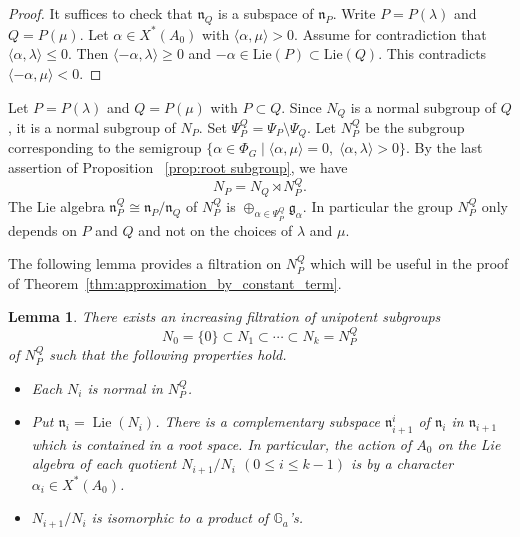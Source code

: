 \documentclass[letterpaper,11pt]{amsart}
\newcommand{\fg}{\mathfrak{g}}
\newcommand{\fn}{\mathfrak{n}}
\newcommand{\bG}{\mathbb{G}}
\newcommand{\<}{\negthickspace}
\DeclareMathOperator{\Lie}{Lie}
\theoremstyle{definition}
\theoremstyle{plain}
\newtheorem{lemma}[definition]{Lemma}
\theoremstyle{remark}
\numberwithin{equation}{section}
\begin{document}
\begin{proof}
It suffices to check that $\fn_Q$ is a subspace of $\fn_P$. Write
$P=P(\lambda)$ and $Q=P(\mu)$. Let $\alpha \in X^*(A_0)$ with $\langle \alpha, \mu \rangle > 0$. Assume for contradiction that $\langle
\alpha, \lambda \rangle \le 0$. Then $\langle -\alpha, \lambda \rangle \ge
0$ and $-\alpha \in \mathrm{Lie}(P) \subset \mathrm{Lie}(Q)$. This
contradicts $\langle -\alpha, \mu  \rangle < 0$.
\end{proof}

Let $P=P(\lambda)$ and $Q=P(\mu)$ with $P \subset Q$. Since $N_Q$ is a normal
subgroup of $Q$, it is a normal subgroup of $N_P$. Set $\Psi_P^Q=\Psi_P \setminus \Psi_Q$. Let $N_P^Q$ be the
subgroup corresponding to the semigroup $\{ \alpha \in \Phi_G \mid \langle \alpha, \mu
\rangle = 0, \; \langle \alpha , \lambda \rangle > 0 \}$. By the last assertion of Proposition
~\ref{prop:root subgroup}, we have
    \[
    N_P = N_Q \rtimes N_P^Q.
    \]
The Lie algebra $\fn_P^Q \cong \fn_P/\fn_Q$ of $N_P^Q$ is $\oplus_{\alpha \in \Psi_P^Q} \fg_\alpha$. In particular the group $N_P^Q$ only depends on $P$
and $Q$ and not on the choices of $\lambda$ and $\mu$.

The following lemma provides a filtration on $N_P^Q$ which will be useful in the
proof of Theorem~\ref{thm:approximation_by_constant_term}.

\begin{lemma} \label{lem:filtration_of_NPQ}
    There exists an increasing filtration of unipotent subgroups
        \[
            N_0=\{0\} \subset N_1 \subset \cdots \subset N_k=N_P^Q
        \]
    of $N_P^Q$ such that the following properties hold.
        \begin{itemize}
            \item Each $N_i$ is normal in $N_P^Q$.

            \item Put $\fn_i = \Lie(N_i)$. There is a complementary subspace $\fn_{i+1}^i$ of
            $\fn_i$ in $\fn_{i+1}$ which is contained in a root space. In
            particular, the action of $A_0$ on the Lie algebra of each
            quotient $N_{i+1}/N_{i}$ $(0 \le i \le k-1)$ is by a character
            $\alpha_i \in X^*(A_0)$.

            \item $N_{i+1}/N_{i}$ is isomorphic to a product of $\bG_a$'s.
        \end{itemize}
\end{lemma}
\end{document}
